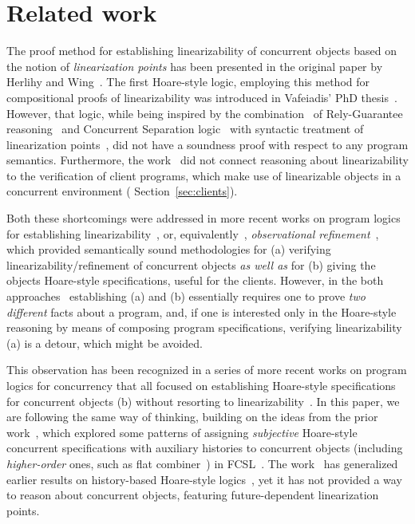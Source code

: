 \section{Related work}
\label{sc:related}


The proof method for establishing linearizability of concurrent
objects based on the notion of \emph{linearization points} has been
presented in the original paper by Herlihy and
Wing~\cite{Herlihy-Wing:TOPLAS90}. The first Hoare-style logic,
employing this method for compositional proofs of linearizability was
introduced in Vafeiadis' PhD thesis~\cite{Vafeiadis:PhD}. However,
that logic, while being inspired by the
combination~\cite{Vafeiadis-Parkinson:CONCUR07} of Rely-Guarantee
reasoning~\cite{Jones:TOPLAS83} and Concurrent Separation
logic~\cite{OHearn:TCS07} with syntactic treatment of linearization
points~\cite{Vafeiadis-al:PPoPP06}, did not have a soundness proof
with respect to any program semantics. Furthermore, the
work~\cite{Vafeiadis:PhD} did not connect reasoning about
linearizability to the verification of client programs, which make use
of linearizable objects in a concurrent environment (\cf
Section~\ref{sec:clients}).


Both these shortcomings were addressed in more recent works on program
logics for establishing linearizability~\cite{Liang-Feng:PLDI13}, or,
equivalently~\cite{Filipovic-al:TCS10}, \emph{observational
  refinement}~\cite{Turon-al:ICFP13}, which provided semantically
sound methodologies for (a) verifying linearizability/refinement of
concurrent objects \emph{as well as} for (b) giving the objects
Hoare-style specifications, useful for the clients.
%
However, in the both
approaches~\cite{Liang-Feng:PLDI13,Turon-al:ICFP13} establishing (a)
and (b) essentially requires one to prove \emph{two different} facts
about a program, and, if one is interested only in the Hoare-style
reasoning by means of composing program specifications, verifying
linearizability (a) is a detour, which might be avoided.


This observation has been recognized in a series of more recent works
on program logics for concurrency that all focused on establishing
Hoare-style specifications for concurrent objects (b) without
resorting to
linearizability~\cite{Sergey-al:ESOP15,Svendsen-Birkedal:ESOP14,ArrozPincho-al:ECOOP14,Jung-al:POPL15}.
%
In this paper, we are following the same way of thinking, building on
the ideas from the prior work~\cite{Sergey-al:ESOP15}, which explored
some patterns of assigning \emph{subjective} Hoare-style concurrent
specifications with auxiliary histories to concurrent objects
(including \emph{higher-order} ones, such as {flat
  combiner}~\cite{Hendler-al:SPAA10}) in
FCSL~\cite{Nanevski-al:ESOP14}. The work~\cite{Sergey-al:ESOP15} has
generalized earlier results on history-based Hoare-style
logics~\cite{Fu-al:CONCUR10, Gotsman-al:ESOP13,Bell-al:SAS10}, yet it
has not provided a way to reason about concurrent objects, featuring
future-dependent linearization points.
%

